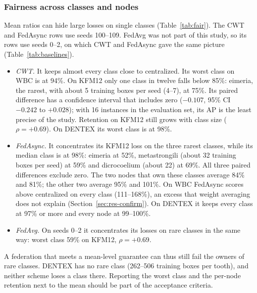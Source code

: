 \documentclass[pdflatex,sn-mathphys-num]{sn-jnl}
\begin{document}
\subsubsection{Fairness across classes and nodes}
Mean ratios can hide large losses on single classes (Table~\ref{tab:fair}). The CWT and FedAsync rows use seeds 100--109. FedAvg was not part of this study, so its rows use seeds 0--2, on which CWT and FedAsync gave the same picture (Table~\ref{tab:baselines}).
\begin{itemize}
\item \emph{CWT.} It keeps almost every class close to centralized. Its worst class on WBC is at 94\%. On KFM12 only one class in twelve falls below 85\%: eimeria, the rarest, with about 5 training boxes per seed (4--7), at 75\%. Its paired difference has a confidence interval that includes zero ($-0.107$, 95\% CI $-0.242$ to $+0.028$); with 16 instances in the evaluation set, its AP is the least precise of the study. Retention on KFM12 still grows with class size ($\rho=+0.69$). On DENTEX its worst class is at 98\%.
\item \emph{FedAsync.} It concentrates its KFM12 loss on the three rarest classes, while its median class is at 98\%: eimeria at 52\%, metastrongili (about 32 training boxes per seed) at 59\% and dicrocoelium (about 22) at 69\%. All three paired differences exclude zero. The two nodes that own these classes average 84\% and 81\%; the other two average 95\% and 101\%. On WBC FedAsync scores above centralized on every class (111--168\%), an excess that weight averaging does not explain (Section~\ref{sec:res-confirm}). On DENTEX it keeps every class at 97\% or more and every node at 99--100\%.
\item \emph{FedAvg.} On seeds 0--2 it concentrates its losses on rare classes in the same way: worst class 59\% on KFM12, $\rho=+0.69$.
\end{itemize}
A federation that meets a mean-level guarantee can thus still fail the owners of rare classes. DENTEX has no rare class (262--506 training boxes per tooth), and neither scheme loses a class there. Reporting the worst class and the per-node retention next to the mean should be part of the acceptance criteria.
\end{document}
